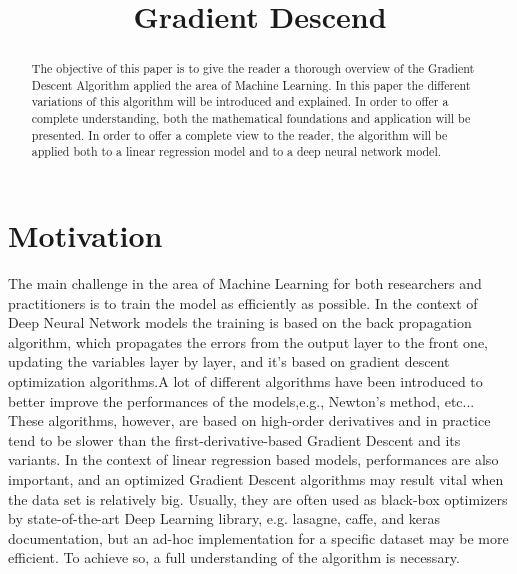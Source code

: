 \documentclass[conference]{IEEEtran}
\begin{document}
\title{Gradient Descend\\}

\author{
}

\maketitle


\begin{abstract}
The objective of this paper is to give the reader a thorough overview of the Gradient Descent Algorithm applied the area of Machine Learning. In this paper the different variations of this algorithm will be introduced and explained. In order to offer a complete understanding, both the mathematical foundations and application will be presented. 
In order to offer a complete view to the reader, the algorithm will be applied both to a linear regression model and to a deep neural network model. 
\end{abstract}


\section{Motivation}
The main challenge in the area of Machine Learning for both researchers and practitioners is to train the model as efficiently as possible. In the context of Deep Neural Network models the training is based on the back propagation algorithm, which propagates the errors from the output layer to the front one, updating the variables layer by layer, and it's based on gradient descent optimization algorithms.A lot of different algorithms have been introduced to better improve the performances of the models,e.g., Newton’s method, etc... These algorithms, however, are based on high-order derivatives and in practice tend to be slower than the first-derivative-based Gradient Descent and its variants. 
In the context of linear regression based models, performances are also important, and an optimized Gradient Descent algorithms may result vital when the data set is relatively big. Usually, they are often used as black-box optimizers by state-of-the-art Deep Learning library, e.g. lasagne, caffe, and keras documentation, but an ad-hoc implementation for a specific dataset may be more efficient. To achieve so, a full understanding of the algorithm is necessary. 
\end{document}
